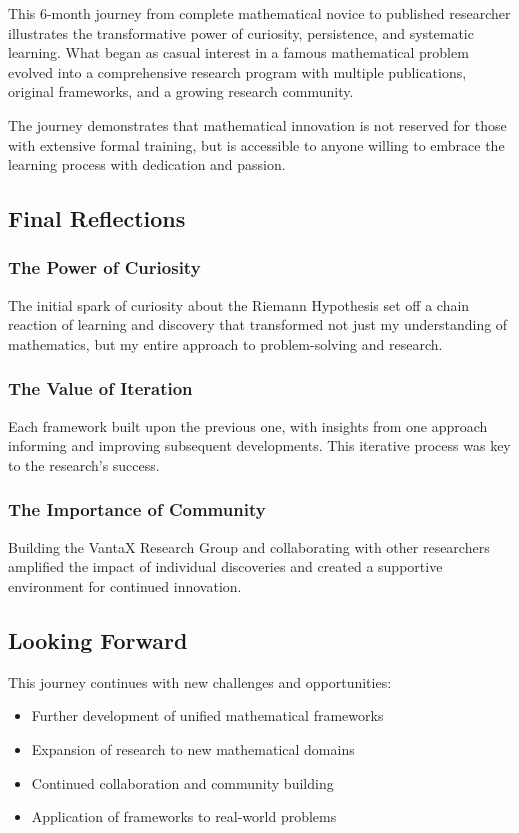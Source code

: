 \documentclass[12pt]{article}
\begin{document}
This 6-month journey from complete mathematical novice to published researcher illustrates the transformative power of curiosity, persistence, and systematic learning. What began as casual interest in a famous mathematical problem evolved into a comprehensive research program with multiple publications, original frameworks, and a growing research community.

The journey demonstrates that mathematical innovation is not reserved for those with extensive formal training, but is accessible to anyone willing to embrace the learning process with dedication and passion.

\subsection{Final Reflections}

\subsubsection{The Power of Curiosity}

The initial spark of curiosity about the Riemann Hypothesis set off a chain reaction of learning and discovery that transformed not just my understanding of mathematics, but my entire approach to problem-solving and research.

\subsubsection{The Value of Iteration}

Each framework built upon the previous one, with insights from one approach informing and improving subsequent developments. This iterative process was key to the research's success.

\subsubsection{The Importance of Community}

Building the VantaX Research Group and collaborating with other researchers amplified the impact of individual discoveries and created a supportive environment for continued innovation.

\subsection{Looking Forward}

This journey continues with new challenges and opportunities:
\begin{itemize}
    \item Further development of unified mathematical frameworks
    \item Expansion of research to new mathematical domains
    \item Continued collaboration and community building
    \item Application of frameworks to real-world problems
\end{itemize}
\end{document}

